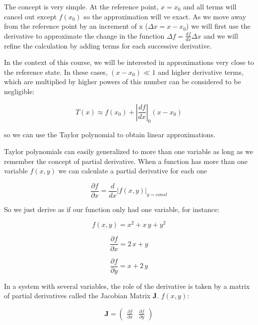 \documentclass{tufte-book} %
\begin{document}
The concept is very simple. At the reference point, $x=x_0$ and all terms will cancel out except $f(x_0)$ so the approximation will ve exact. As we move away from the reference point by an increment of x ($\Delta x = x - x_0$) we will first use the derivative to approximate the change in the function $\Delta f= \frac{df}{dx}\Delta x$ and we will refine the calculation by adding terms for each successive derivative.

In the context of this course, we will be interested in approximations very close to the reference state. In these cases, $\left( x - x_0\right) \ll 1$ and higher derivative terms, which are multiplied by higher powers of this number can be considered to be negligible:

\begin{equation}
	\label{TaylorLin}
	T(x) \approx  f(x_0) + \left|\frac{df}{dx}\right|_0 \left( x - x_0\right)
\end{equation}

so we can use the Taylor polynomial to obtain  linear approximations.

Taylor polynomials can easily generalized to more than one variable as long as we remember the concept of partial derivative. When a function has more than one variable $f(x,y)$ we can calculate a partial derivative for each one

\begin{equation}
	\frac{\partial f}{\partial x} =\frac{d}{dx} \left| f(x,y) \right|_{y=const}  \nonumber
\end{equation}

So we just derive as if our function only had one variable, for instance:

\begin{equation}
	f(x,y) = x^2 + x \, y + y^2 \nonumber
\end{equation}


\begin{equation}
	\frac{\partial f}{\partial x} = 2 \, x + y \nonumber
\end{equation}

\begin{equation}
	\frac{\partial f}{\partial y} =  x + 2 \,y \nonumber
\end{equation}

In a system with several variables, the role of the derivative is taken by a matrix of partial derivatives called the Jacobian Matrix $\mathbf{J}$.  $f(x,y)$:

\begin{equation}
	\mathbf{J} = \begin{pmatrix} \frac{\partial f}{\partial x} & \frac{\partial f}{\partial y} \end{pmatrix} \nonumber
\end{equation}
\end{document}
